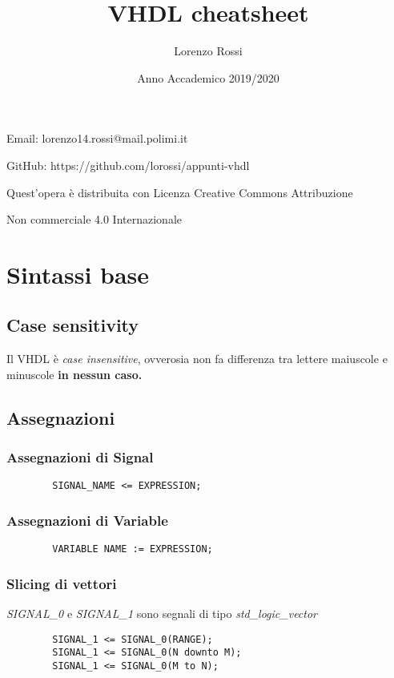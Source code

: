 \documentclass{article}
\title{\Huge VHDL cheatsheet}
\author{\LARGE Lorenzo Rossi}
\date{\LARGE Anno Accademico 2019/2020}
\begin{document}
\maketitle

\vspace{15em}

\large
\begin{doublespacing}
\centerline{Email: lorenzo14.rossi@mail.polimi.it}
\centerline{GitHub: https://github.com/lorossi/appunti-vhdl}

\vspace{16em}
\centerline{Quest'opera è distribuita con Licenza Creative Commons Attribuzione}
\centerline{Non commerciale 4.0 Internazionale \ccbynceu}
\end{doublespacing}
\newpage



\tableofcontents
\clearpage
{}
\newpage

\section{Sintassi base}
\subsection{Case sensitivity}
Il VHDL è \textit{case insensitive}, ovverosia non fa differenza tra lettere maiuscole e minuscole \textbf{in nessun caso.}
\subsection{Assegnazioni}
\subsubsection{Assegnazioni di Signal}
\begin{verbatim}
	    SIGNAL_NAME <= EXPRESSION;
\end{verbatim}
\subsubsection{Assegnazioni di Variable}
\begin{verbatim}
	    VARIABLE NAME := EXPRESSION;
\end{verbatim}
\subsubsection{Slicing di vettori}
\textit{SIGNAL\_0} e \textit{SIGNAL\_1} sono segnali di tipo \textit{std\_logic\_vector}
\begin{verbatim}
	    SIGNAL_1 <= SIGNAL_0(RANGE);
	    SIGNAL_1 <= SIGNAL_0(N downto M);
	    SIGNAL_1 <= SIGNAL_0(M to N);
\end{verbatim}
\end{document}
